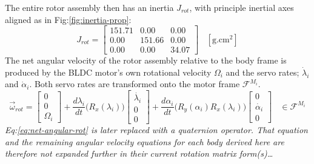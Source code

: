 \par
The entire rotor assembly then has an inertia $J_{rot}$, with principle inertial axes aligned as in Fig:\ref{fig:inertia-prop}:
\begin{equation}
J_{rot}=\begin{bmatrix}
151.71 & 0.00 & 0.00\\
0.00 & 151.66 & 0.00\\
0.00 & 0.00 & 34.07
\end{bmatrix}~~~~[\text{g.cm}^2]
\end{equation}
The net angular velocity of the rotor assembly relative to the body frame is produced by the BLDC motor's own rotational velocity $\Omega_i$ and the servo rates; $\dot{\lambda}_i$ and $\dot{\alpha}_i$. Both servo rates are transformed onto the motor frame $\mathcal{F}^{M_i}$.
\begin{equation}\label{eq:net-angular-rot}
\vec{\omega}_{rot}=\begin{bmatrix}
0\\
0\\
\Omega_i
\end{bmatrix}
+\frac{d\lambda_i}{dt}\big(R_x(\lambda_i)\big)\begin{bmatrix}
\dot{\lambda_i}\\
0\\
0
\end{bmatrix}+\frac{d\alpha_i}{dt}\big(R_y(\alpha_i)R_x(\lambda_i)\big)\begin{bmatrix}
0\\
\dot{\alpha_i}\\
0
\end{bmatrix}~~~~\in\mathcal{F}^{M_i}
\end{equation}
\emph{\color{gray} Eq:\ref{eq:net-angular-rot} is later replaced with a quaternion operator. That equation and the remaining angular velocity equations for each body derived here are therefore not expanded further in their current rotation matrix form(s)\ldots}

